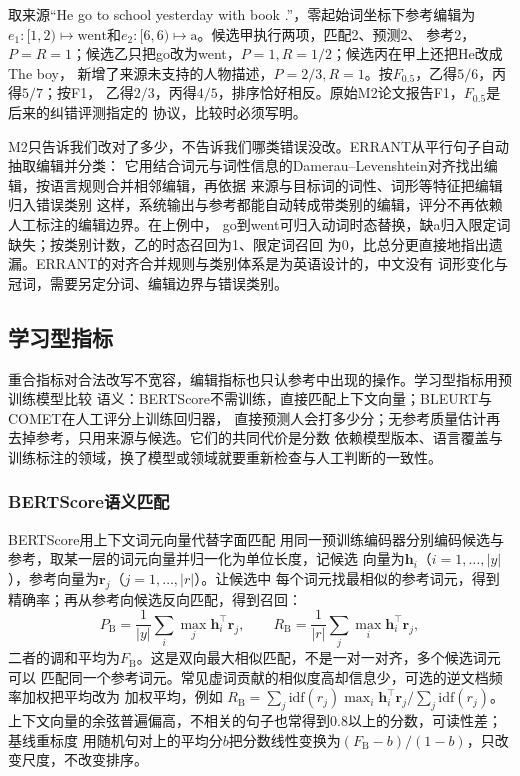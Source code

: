 取来源“He go to school yesterday with book .”，零起始词坐标下参考编辑为
$e_1:[1,2)\mapsto\text{went}$和$e_2:[6,6)\mapsto\text{a}$。候选甲执行两项，匹配2、预测2、
参考2，$P=R=1$；候选乙只把go改为went，$P=1,R=1/2$；候选丙在甲上还把He改成The boy，
新增了来源未支持的人物描述，$P=2/3,R=1$。按$F_{0.5}$，乙得$5/6$，丙得$5/7$；按F1，
乙得$2/3$，丙得$4/5$，排序恰好相反。原始M2论文报告F1，$F_{0.5}$是后来的纠错评测指定的
协议，比较时必须写明。

M2只告诉我们改对了多少，不告诉我们哪类错误没改。ERRANT从平行句子自动抽取编辑并分类：
它用结合词元与词性信息的Damerau--Levenshtein对齐找出编辑，按语言规则合并相邻编辑，再依据
来源与目标词的词性、词形等特征把编辑归入错误类别
这样，系统输出与参考都能自动转成带类别的编辑，评分不再依赖人工标注的编辑边界。在上例中，
go到went可归入动词时态替换，缺a归入限定词缺失；按类别计数，乙的时态召回为1、限定词召回
为0，比总分更直接地指出遗漏。ERRANT的对齐合并规则与类别体系是为英语设计的，中文没有
词形变化与冠词，需要另定分词、编辑边界与错误类别。

\subsection{学习型指标}
\label{sec:nlp-generation-learned-metrics}

重合指标对合法改写不宽容，编辑指标也只认参考中出现的操作。学习型指标用预训练模型比较
语义：BERTScore不需训练，直接匹配上下文向量；BLEURT与COMET在人工评分上训练回归器，
直接预测人会打多少分；无参考质量估计再去掉参考，只用来源与候选。它们的共同代价是分数
依赖模型版本、语言覆盖与训练标注的领域，换了模型或领域就要重新检查与人工判断的一致性。

\subsubsection{BERTScore语义匹配}
\label{sec:nlp-generation-bertscore}

BERTScore用上下文词元向量代替字面匹配
用同一预训练编码器分别编码候选与参考，取某一层的词元向量并归一化为单位长度，记候选
向量为$\bm h_i$（$i=1,\ldots,|y|$），参考向量为$\bm r_j$（$j=1,\ldots,|r|$）。让候选中
每个词元找最相似的参考词元，得到精确率；再从参考向候选反向匹配，得到召回：
\begin{equation}
  P_{\mathrm{B}}=\frac{1}{|y|}\sum_i\max_j\bm h_i^\top\bm r_j,\qquad
  R_{\mathrm{B}}=\frac{1}{|r|}\sum_j\max_i\bm h_i^\top\bm r_j,
  \label{eq:nlp-generation-bertscore}
\end{equation}
二者的调和平均为$F_{\mathrm B}$。这是双向最大相似匹配，不是一对一对齐，多个候选词元可以
匹配同一个参考词元。常见虚词贡献的相似度高却信息少，可选的逆文档频率加权把平均改为
加权平均，例如
$R_{\mathrm B}=\sum_j\mathrm{idf}(r_j)\max_i\bm h_i^\top\bm r_j/\sum_j\mathrm{idf}(r_j)$。
上下文向量的余弦普遍偏高，不相关的句子也常得到0.8以上的分数，可读性差；基线重标度
用随机句对上的平均分$b$把分数线性变换为$(F_{\mathrm B}-b)/(1-b)$，只改变尺度，不改变排序。

